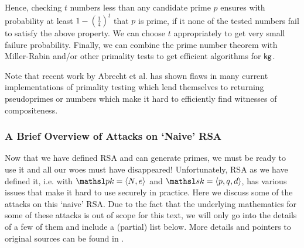 Hence, checking $t$ numbers less than any candidate prime $p$ ensures with probability at least $1-\left(\frac{1}{4}\right)^t$ that $p$ is prime, if it none of the tested numbers fail to satisfy the above property. We can choose $t$ appropriately to get very small failure probability. Finally, we can combine the prime number theorem with Miller-Rabin and/or other primality tests to get efficient algorithms for ${\sf kg}$.

Note that recent work by Abrecht et al. \cite{albrecht2018prime} has shown flaws in many current implementations of primality testing which lend themselves to returning pseudoprimes or numbers which make it hard to efficiently find witnesses of compositeness.

\subsubsection{A Brief Overview of Attacks on `Naive' RSA}
Now that we have defined RSA and can generate primes, we must be ready to use it and all our woes must have disappeared! Unfortunately, RSA as we have defined it, i.e. with $\pk = \langle N, e\rangle$ and $\sk =\langle p, q, d \rangle$, has various issues that make it hard to use securely in practice. Here we discuss some of the attacks on this `naive' RSA. Due to the fact that the underlying mathematics for some of these attacks is out of scope for this text, we will only go into the details of a few of them and include a (partial) list below. More details and pointers to original sources can be found in \cite{boneh1999twenty}.

